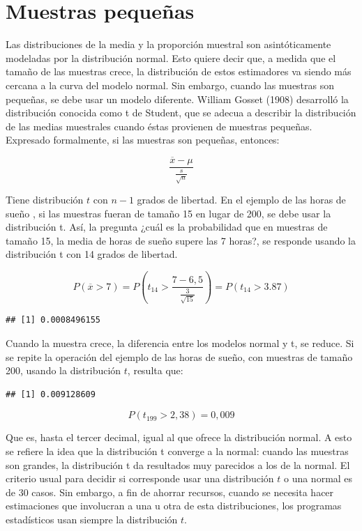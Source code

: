 \documentclass[]{book}
\begin{document}
\hypertarget{muestras-pequeuxf1as}{%
\section{Muestras pequeñas}\label{muestras-pequeuxf1as}}

Las distribuciones de la media y la proporción muestral son
asintóticamente modeladas por la distribución normal. Esto quiere decir
que, a medida que el tamaño de las muestras crece, la distribución de
estos estimadores va siendo más cercana a la curva del modelo normal.
Sin embargo, cuando las muestras son pequeñas, se debe usar un modelo
diferente. William Gosset (1908) desarrolló la distribución conocida
como t de Student, que se adecua a describir la distribución de las
medias muestrales cuando éstas provienen de muestras pequeñas. Expresado
formalmente, si las muestras son pequeñas, entonces:

\[\frac{\overline{x} - \mu}{\frac{s}{\sqrt{n}}}\]

Tiene distribución \(t\) con \(n - 1\) grados de libertad. En el ejemplo
de las horas de sueño , si las muestras fueran de tamaño 15 en lugar de 200, se debe usar la distribución t. Así, la pregunta ¿cuál es la probabilidad que en muestras de tamaño 15, la media de horas de sueño supere las 7 horas?, se responde usando la distribución t con 14 grados de libertad.

\[P(\overline{x} > 7) = P(t_{14} > \frac{7 - 6,5}{\frac{3}{\sqrt{15}}}) = P(t_{14} > 3.87)\]

\begin{verbatim}
## [1] 0.0008496155
\end{verbatim}

Cuando la muestra crece, la diferencia entre los modelos normal y t, se
reduce. Si se repite la operación del ejemplo de las horas de sueño, con muestras de tamaño 200, usando la distribución \(t\), resulta que:

\begin{verbatim}
## [1] 0.009128609
\end{verbatim}

\[P(t_{199} > 2,38) = 0,009\]

Que es, hasta el tercer decimal, igual al que ofrece la distribución normal. A esto se refiere la idea que la distribución t converge a la normal: cuando las muestras son grandes, la distribución t da resultados muy parecidos a los de la normal. El criterio usual para decidir si corresponde usar una distribución \(t\) o una normal es de 30 casos. Sin embargo, a fin de ahorrar recursos, cuando se necesita hacer estimaciones que involucran a una u otra de esta distribuciones, los programas estadísticos usan siempre la distribución \(t\).
\end{document}
